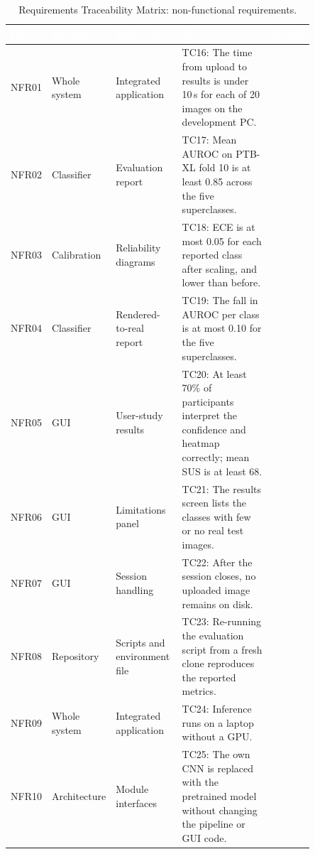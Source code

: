 \documentclass[12pt,nonacm,acmlarge,titlepage,screen]{acmart}
\begin{document}
\begin{table}[H]
  \centering
  \footnotesize
  \setlength{\arrayrulewidth}{0.8pt}
  \renewcommand{\arraystretch}{1.25}
  \caption{Requirements Traceability Matrix: non-functional requirements.}
  \label{tab:rtm-nfr}
  \begin{tabular}{|P{0.07\linewidth}|P{0.15\linewidth}|P{0.16\linewidth}|P{0.39\linewidth}|P{0.08\linewidth}|}
    \hline
    \textcolor{white}{\textbf{ID}} & \textcolor{white}{\textbf{Module}} &
    \textcolor{white}{\textbf{Deliverable}} & \textcolor{white}{\textbf{Test case}} &
    \textcolor{white}{\textbf{Result}} \\
    \hline
    NFR01 & Whole system & Integrated application & TC16: The time from upload to results is under 10\,s for each of 20 images on the development PC. & \\
    \hline
    NFR02 & Classifier & Evaluation report & TC17: Mean AUROC on PTB-XL fold 10 is at least 0.85 across the five superclasses. & \\
    \hline
    NFR03 & Calibration & Reliability diagrams & TC18: ECE is at most 0.05 for each reported class after scaling, and lower than before. & \\
    \hline
    NFR04 & Classifier & Rendered-to-real report & TC19: The fall in AUROC per class is at most 0.10 for the five superclasses. & \\
    \hline
    NFR05 & GUI & User-study results & TC20: At least 70\% of participants interpret the confidence and heatmap correctly; mean SUS is at least 68. & \\
    \hline
    NFR06 & GUI & Limitations panel & TC21: The results screen lists the classes with few or no real test images. & \\
    \hline
    NFR07 & GUI & Session handling & TC22: After the session closes, no uploaded image remains on disk. & \\
    \hline
    NFR08 & Repository & Scripts and environment file & TC23: Re-running the evaluation script from a fresh clone reproduces the reported metrics. & \\
    \hline
    NFR09 & Whole system & Integrated application & TC24: Inference runs on a laptop without a GPU. & \\
    \hline
    NFR10 & Architecture & Module interfaces & TC25: The own CNN is replaced with the pretrained model without changing the pipeline or GUI code. & \\
    \hline
  \end{tabular}
\end{table}
\end{document}

